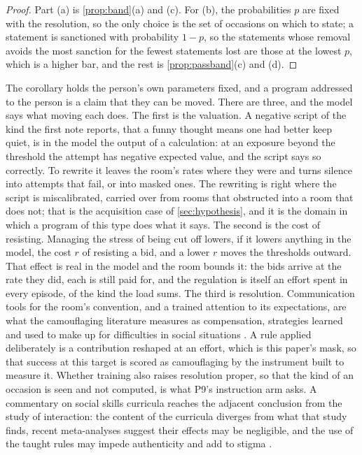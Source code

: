 \begin{proof}
Part (a) is \autoref{prop:band}(a) and (c). For (b), the probabilities $p$ are fixed with the resolution, so the only choice is the set of occasions on which to state; a statement is sanctioned with probability $1 - p$, so the statements whose removal avoids the most sanction for the fewest statements lost are those at the lowest $p$, which is a higher bar, and the rest is \autoref{prop:passband}(c) and (d).
\end{proof}

The corollary holds the person's own parameters fixed, and a program addressed to the person is a claim that they can be moved. There are three, and the model says what moving each does. The first is the valuation. A negative script of the kind the first note reports, that a funny thought means one had better keep quiet, is in the model the output of a calculation: at an exposure beyond the threshold the attempt has negative expected value, and the script says so correctly. To rewrite it leaves the room's rates where they were and turns silence into attempts that fail, or into masked ones. The rewriting is right where the script is miscalibrated, carried over from rooms that obstructed into a room that does not; that is the acquisition case of \autoref{sec:hypothesis}, and it is the domain in which a program of this type does what it says. The second is the cost of resisting. Managing the stress of being cut off lowers, if it lowers anything in the model, the cost $r$ of resisting a bid, and a lower $r$ moves the thresholds outward. That effect is real in the model and the room bounds it: the bids arrive at the rate they did, each is still paid for, and the regulation is itself an effort spent in every episode, of the kind the load sums. The third is resolution. Communication tools for the room's convention, and a trained attention to its expectations, are what the camouflaging literature measures as compensation, strategies learned and used to make up for difficulties in social situations \cite{Hull2019, Livingston2019}. A rule applied deliberately is a contribution reshaped at an effort, which is this paper's mask, so that success at this target is scored as camouflaging by the instrument built to measure it. Whether training also raises resolution proper, so that the kind of an occasion is seen and not computed, is what P9's instruction arm asks. A commentary on social skills curricula reaches the adjacent conclusion from the study of interaction: the content of the curricula diverges from what that study finds, recent meta-analyses suggest their effects may be negligible, and the use of the taught rules may impede authenticity and add to stigma \cite{BottemaBeutel2018}.

